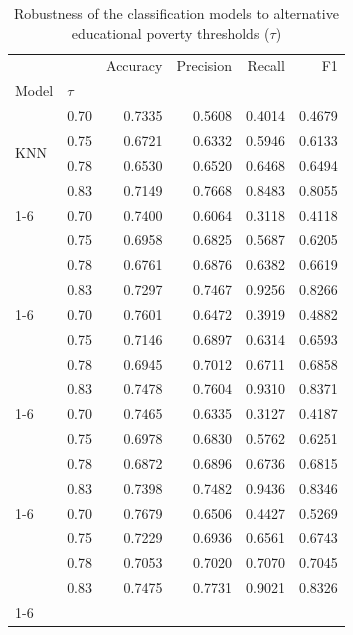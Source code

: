 \begin{table}
\caption{Robustness of the classification models to alternative educational poverty thresholds ($\tau$)}
\label{tab:robustez_umbral}
\begin{tabular}{llrrrr}
\toprule
 &  & Accuracy & Precision & Recall & F1 \\
Model & $\tau$ &  &  &  &  \\
\midrule
\multirow[t]{4}{*}{KNN} & 0.70 & 0.7335 & 0.5608 & 0.4014 & 0.4679 \\
 & 0.75 & 0.6721 & 0.6332 & 0.5946 & 0.6133 \\
 & 0.78 & 0.6530 & 0.6520 & 0.6468 & 0.6494 \\
 & 0.83 & 0.7149 & 0.7668 & 0.8483 & 0.8055 \\
\cline{1-6}
\multirow[t]{4}{*}{Logit} & 0.70 & 0.7400 & 0.6064 & 0.3118 & 0.4118 \\
 & 0.75 & 0.6958 & 0.6825 & 0.5687 & 0.6205 \\
 & 0.78 & 0.6761 & 0.6876 & 0.6382 & 0.6619 \\
 & 0.83 & 0.7297 & 0.7467 & 0.9256 & 0.8266 \\
\cline{1-6}
\multirow[t]{4}{*}{Random Forest} & 0.70 & 0.7601 & 0.6472 & 0.3919 & 0.4882 \\
 & 0.75 & 0.7146 & 0.6897 & 0.6314 & 0.6593 \\
 & 0.78 & 0.6945 & 0.7012 & 0.6711 & 0.6858 \\
 & 0.83 & 0.7478 & 0.7604 & 0.9310 & 0.8371 \\
\cline{1-6}
\multirow[t]{4}{*}{SVM} & 0.70 & 0.7465 & 0.6335 & 0.3127 & 0.4187 \\
 & 0.75 & 0.6978 & 0.6830 & 0.5762 & 0.6251 \\
 & 0.78 & 0.6872 & 0.6896 & 0.6736 & 0.6815 \\
 & 0.83 & 0.7398 & 0.7482 & 0.9436 & 0.8346 \\
\cline{1-6}
\multirow[t]{4}{*}{XGBoost} & 0.70 & 0.7679 & 0.6506 & 0.4427 & 0.5269 \\
 & 0.75 & 0.7229 & 0.6936 & 0.6561 & 0.6743 \\
 & 0.78 & 0.7053 & 0.7020 & 0.7070 & 0.7045 \\
 & 0.83 & 0.7475 & 0.7731 & 0.9021 & 0.8326 \\
\cline{1-6}
\bottomrule
\end{tabular}
\end{table}
